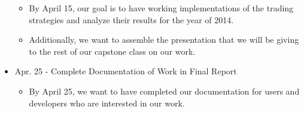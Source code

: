 \begin{itemize}
  \begin{itemize}
  \item By April 15, our goal is to have working implementations of the trading strategies and analyze their results for the year of 2014.
  \item Additionally, we want to assemble the presentation that we will be giving to the rest of our capstone class on our work.
  \end{itemize}
\item Apr. 25 - Complete Documentation of Work in Final Report
  \begin{itemize}
  \item By April 25, we want to have completed our documentation for users and developers who are interested in our work.
  \end{itemize}
\end{itemize}


